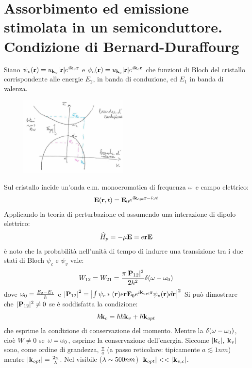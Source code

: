 \section{Assorbimento ed emissione stimolata in un semiconduttore. Condizione di Bernard-Duraffourg}
Siano $\psi_v(\mathbf{r}) = u_{\mathbf{k}_v} |\mathbf{r}| e^{i\mathbf{k}_v \mathbf{r}}$ e $\psi_c(\mathbf{r}) = u_{\mathbf{k}_c} |\mathbf{r}| e^{i\mathbf{k}_c \mathbf{r}}$ che  funzioni di Bloch del cristallo corrispondente alle energie $E_2$, in banda di conduzione, ed $E_1$ in banda di valenza.
\begin{figure}[H]
\centering
\includegraphics[height=4cm]{images/laser_80_4}
\end{figure}
\noindent
Sul cristallo incide un'onda e.m. monocromatica di frequenza $\omega$ e campo elettrico:
\begin{equation*}
\mathbf{E}(\mathbf{r},t) = \mathbf{E}_0 e^{i\mathbf{k}_{opt} \mathbf{r} - i\omega t}
\end{equation*}
Applicando la teoria di perturbazione ed assumendo una interazione di dipolo elettrico:
\begin{equation*}
\widehat{H}_p = -\mathbf{\mu} \mathbf{E} = e\mathbf{r} \mathbf{E}
\end{equation*}
è noto che la probabilità nell'unità di tempo di indurre una transizione tra i due stati di Bloch $\psi_c$ e $\psi_v$ vale:
\begin{equation*}
W_{12} = W_{21} = \frac{\pi |\mathbf{P}_{12}|^2}{2\hbar^2} \delta(\omega - \omega_0)
\end{equation*}
dove $\omega_0 = \frac{E_2 - E_1}{\hbar}$ e $\left|\mathbf{P}_{12}\right|^2 = \left| \int \psi_c*(\mathbf{r}) e \mathbf{r} \mathbf{E}_0 e^{i\mathbf{k}_{opt} \mathbf{r}} \psi_v(\mathbf{r}) d\mathbf{r} \right|^2$
Si può dimostrare che $|\mathbf{P}_{12}|^2 \neq 0$ se è soddisfatta la condizione:
\begin{equation*}
\hbar\mathbf{k}_c = \hbar \hbar \mathbf{k}_v + \hbar \mathbf{k}_{opt}
\end{equation*}
che esprime la condizione di conservazione del momento.
Mentre la $\delta(\omega - \omega_0)$, cioè $W\neq 0$ se $\omega = \omega_0$, esprime la conservazione dell'energia. Siccome $|\mathbf{k}_c|$, $\mathbf{k}_v|$ sono, come ordine di grandezza, $\frac{\pi}{a}$ (a passo reticolare: tipicamente $a \lesssim 1nm$) mentre $|\mathbf{k}_{opt}| = \frac{2\pi}{\lambda}$. Nel visibile ($\lambda \sim 500 nm$) $|\mathbf{k}_{opt}| << |\mathbf{k}_{v,c}|$.
